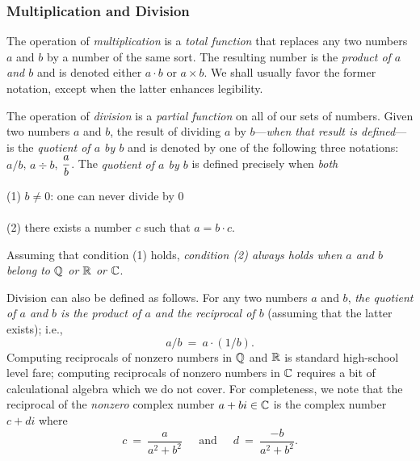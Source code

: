 \subsubsection{Multiplication and Division}

The operation of {\it multiplication}
is a {\em total function} that replaces any two numbers $a$ and $b$ by
a number of the same sort.  The resulting number is the {\em product
  of $a$ and $b$} and is
denoted either $a \cdot b$ 
or $a \times b$.
We shall usually favor the former notation, except when the latter
enhances legibility.

The operation of {\it division} is a {\em
  partial function} on all of our sets of numbers.  Given two numbers
$a$ and $b$, the result of dividing $a$ by $b$---{\em when that result
  is defined}---is the {\it quotient of $a$ by $b$}
and is denoted by one of the following three notations: $a/b$, $a \div
b$, $\displaystyle{a \over b}$.  The {\it quotient of $a$ by $b$} is
defined precisely when {\em both}

\noindent
\hspace*{.35in}(1) $b \neq 0$: one can never divide by $0$ \\
\hspace*{.35in}{\em and} \\
\hspace*{.35in}(2) there exists a number $c$ such that $a = b \cdot c$.

\noindent
Assuming that condition (1) holds, {\em condition (2) always holds
  when $a$ and $b$ belong to $\mathbb{Q}$ or $\mathbb{R}$ or $\mathbb{C}$}.

Division can also be defined as follows.  For any two numbers $a$
and $b$, {\em the quotient of $a$ and $b$ is the product of $a$ and the
reciprocal of $b$} (assuming that the latter exists); i.e.,
\[ a/b \ = \ a \cdot (1/b). \]
Computing reciprocals of nonzero numbers in $\mathbb{Q}$ and $\mathbb{R}$ is standard
high-school level fare; computing reciprocals of nonzero numbers in
$\mathbb{C}$ requires a bit of calculational algebra which we do not cover.
For completeness, we note that the reciprocal of the {\em nonzero}
complex number $a + bi \in \mathbb{C}$ is the complex number $c+di$ where
\[ c \ = \ \frac{a}{a^2 + b^2} \ \ \ \ \
\mbox{ and } \ \ \ \ \
d \ = \ \frac{-b}{a^2 + b^2}.
\]

